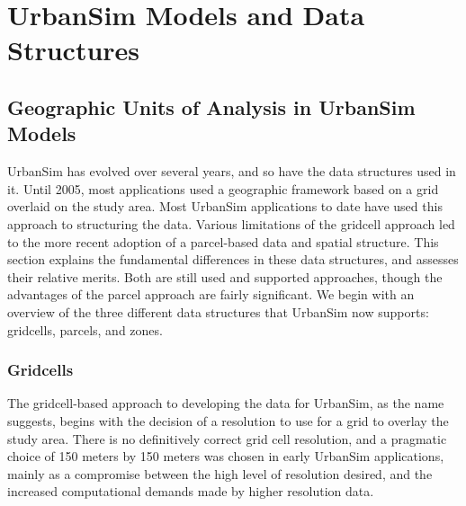 \chapter{UrbanSim Models and Data Structures}

\section{Geographic Units of Analysis in UrbanSim Models}
UrbanSim has evolved over several years, and so have the data
structures used in it.  Until 2005, most applications used a geographic framework based on a grid overlaid on the study area.  Most UrbanSim applications to date have used this approach to structuring the data.  Various limitations of the gridcell approach led to the more recent adoption of a parcel-based data and spatial structure.  This section explains the fundamental differences in these data structures, and assesses their relative merits.  Both are still used and supported approaches, though the advantages of the parcel approach are fairly significant.  We begin with an overview of the three different data structures that UrbanSim now supports: gridcells, parcels, and zones.



\subsection{Gridcells}
The gridcell-based approach to developing the data for UrbanSim, as the name suggests, begins with the decision of a resolution to use for a grid to overlay the study area.  There is no definitively correct grid cell resolution, and a pragmatic choice of 150 meters by 150 meters was chosen in early UrbanSim
applications, mainly as a compromise between the high level of resolution desired, and the increased computational demands made by higher resolution data.

